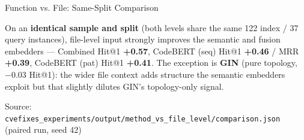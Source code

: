 \documentclass[aspectratio=169,10pt]{beamer}
\begin{document}
\begin{frame}{Function vs. File: Same-Split Comparison}
  \vspace{0.35em}
  \begin{tcolorbox}[colback=hit!5, colframe=hit!70!black, boxrule=0.35pt,
    left=3pt, right=3pt, top=2pt, bottom=1pt, arc=2pt, width=\linewidth]
    \scriptsize
    On an \textbf{identical sample and split} (both levels share the same 122 index / 37
    query instances), file-level input strongly improves the semantic and fusion
    embedders --- Combined Hit@1 \textbf{+0.57}, CodeBERT (seq) Hit@1 \textbf{+0.46} /
    MRR \textbf{+0.39}, CodeBERT (pat) Hit@1 \textbf{+0.41}. The exception is
    \textbf{GIN} (pure topology, \textcolor{miss}{$-0.03$} Hit@1): the wider file context
    adds structure the semantic embedders exploit but that slightly dilutes GIN's
    topology-only signal.
  \end{tcolorbox}

  \vspace{0.2em}
  {\scriptsize\textcolor{notecol}{Source: \texttt{cvefixes\_experiments/output/method\_vs\_file\_level/comparison.json} (paired run, seed 42)}}

\end{frame}



\end{document}
